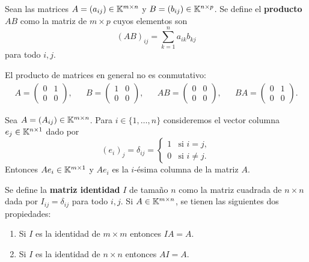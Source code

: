 \begin{block}
    Sean las matrices $A=(a_{ij})\in\mathbb{K}^{m\times n}$ y $B=(b_{ij})\in\mathbb{K}^{n\times
    p}$. Se define el \textbf{producto} $AB$ como la matriz de $m\times p$
    cuyos elementos son
	\[
		(AB)_{ij}=\sum_{k=1}^n a_{ik}b_{kj}
	\]
	para todo $i,j$.
\end{block}

\begin{example}
	El producto de matrices en general no es conmutativo: 
	\begin{align*}
		A=\begin{pmatrix}
			0 & 1\\
			0 & 0
		\end{pmatrix},
		&&
		B=\begin{pmatrix}
			1 & 0\\
			0 & 0
		\end{pmatrix},
		&&
		AB=\begin{pmatrix}
			0 & 0\\
			0 & 0
		\end{pmatrix},
		&&
		BA=\begin{pmatrix}
			0 & 1\\
			0 & 0
		\end{pmatrix}.
	\end{align*}
\end{example}

\begin{example}
    Sea $A=(A_{ij})\in\mathbb{K}^{m\times n}$.  Para $i\in\{1,\dots,n\}$ consideremos
    el vector columna $e_j\in\mathbb{K}^{n\times1}$ dado por
	\[
		(e_i)_j=\delta_{ij}=
		\begin{cases} 
			1 & \text{si $i=j$},\\ 
			0 & \text{si $i\ne j$}.
		\end{cases}
	\]
	Entonces $Ae_i\in\mathbb{K}^{m\times 1}$ y $Ae_i$ es la $i$-ésima columna de la
	matriz $A$.
\end{example}

\begin{block}
	Se define la \textbf{matriz identidad} $I$ de tamaño $n$ como la matriz
	cuadrada de $n\times n$ dada por $I_{ij}=\delta_{ij}$ para todo $i,j$. 
	Si $A\in\mathbb{K}^{m\times n}$, se tienen las siguientes dos propiedades:
	\begin{enumerate}
		\item Si $I$ es la identidad de $m\times m$ entonces $IA=A$.
		\item Si $I$ es la identidad de $n\times n$ entonces $AI=A$.
	\end{enumerate}
\end{block}

